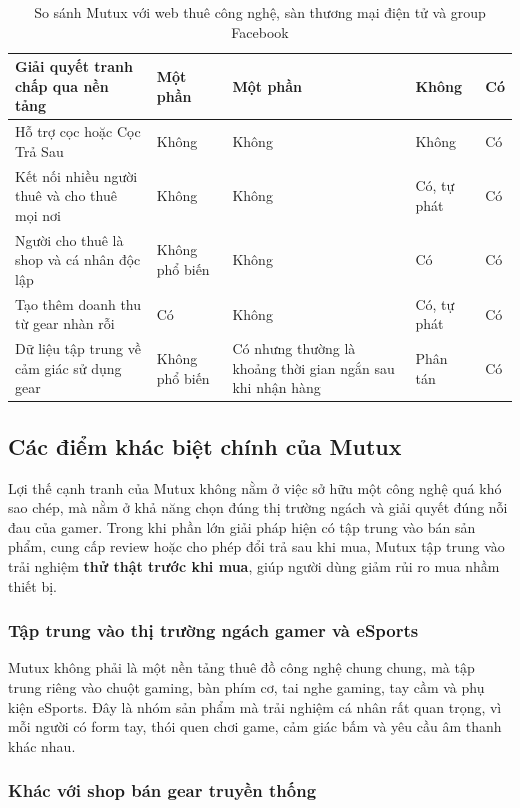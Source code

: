 \begin{table}[H]
\begin{tabular}{|p{4.4cm}|p{2.8cm}|p{2.8cm}|p{2.8cm}|p{2.2cm}|}
        Giải quyết tranh chấp qua nền tảng & Một phần & Một phần & Không & Có \\
        \hline
        Hỗ trợ cọc hoặc Cọc Trả Sau & Không & Không & Không & Có \\
        \hline
        Kết nối nhiều người thuê và cho thuê mọi nơi & Không & Không & Có, tự phát & Có \\
        \hline
        Người cho thuê là shop và cá nhân độc lập & Không phổ biến & Không & Có & Có \\
        \hline
        Tạo thêm doanh thu từ gear nhàn rỗi & Có & Không & Có, tự phát & Có \\
        \hline
        Dữ liệu tập trung về cảm giác sử dụng gear & Không phổ biến & Có nhưng thường là khoảng thời gian ngắn sau khi nhận hàng & Phân tán & Có \\
        \hline
    \end{tabular}
    \renewcommand{\arraystretch}{1}
    \caption{So sánh Mutux với web thuê công nghệ, sàn thương mại điện tử và group Facebook}
\end{table}

\subsection{Các điểm khác biệt chính của Mutux}

Lợi thế cạnh tranh của Mutux không nằm ở việc sở hữu một công nghệ quá khó sao chép, mà nằm ở khả năng chọn đúng thị trường ngách và giải quyết đúng nỗi đau của gamer. Trong khi phần lớn giải pháp hiện có tập trung vào bán sản phẩm, cung cấp review hoặc cho phép đổi trả sau khi mua, Mutux tập trung vào trải nghiệm \textbf{thử thật trước khi mua}, giúp người dùng giảm rủi ro mua nhầm thiết bị.

\subsubsection{Tập trung vào thị trường ngách gamer và eSports}

Mutux không phải là một nền tảng thuê đồ công nghệ chung chung, mà tập trung riêng vào chuột gaming, bàn phím cơ, tai nghe gaming, tay cầm và phụ kiện eSports. Đây là nhóm sản phẩm mà trải nghiệm cá nhân rất quan trọng, vì mỗi người có form tay, thói quen chơi game, cảm giác bấm và yêu cầu âm thanh khác nhau.

\subsubsection{Khác với shop bán gear truyền thống}

